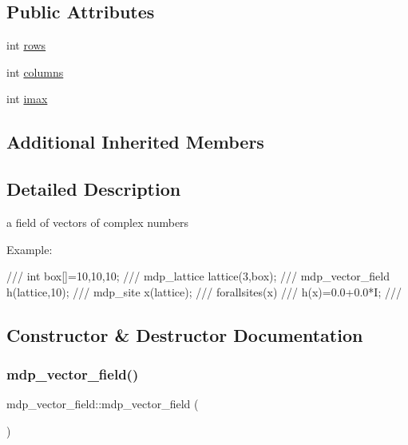 \subsection*{Public Attributes}
\begin{DoxyCompactItemize}
\item 
int \hyperlink{classmdp__vector__field_ace0dc78c30bf473dab2014dac9b56d1d}{rows}
\item 
int \hyperlink{classmdp__vector__field_a79e671979619905202e5b725dabe41db}{columns}
\item 
int \hyperlink{classmdp__vector__field_a20e58b016cfd50221192aafc45029dfb}{imax}
\end{DoxyCompactItemize}
\subsection*{Additional Inherited Members}


\subsection{Detailed Description}
a field of vectors of complex numbers 

Example\+: \begin{DoxyVerb}///    int box[]={10,10,10};
///    mdp_lattice lattice(3,box);
///    mdp_vector_field h(lattice,10);
///    mdp_site x(lattice);
///    forallsites(x)
///      h(x)=0.0+0.0*I;
/// \end{DoxyVerb}
 

\subsection{Constructor \& Destructor Documentation}
\mbox{\label{classmdp__vector__field_a3900cf2abf276128751407dc0795b312}} 
\subsubsection{\texorpdfstring{mdp\+\_\+vector\+\_\+field()}{mdp\_vector\_field()}\hspace{0.1cm}{\footnotesize\ttfamily [1/3]}}
{\footnotesize\ttfamily mdp\+\_\+vector\+\_\+field\+::mdp\+\_\+vector\+\_\+field (\begin{DoxyParamCaption}{ }\end{DoxyParamCaption})\hspace{0.3cm}{\ttfamily [inline]}}

